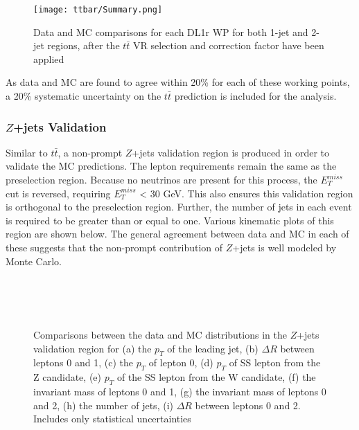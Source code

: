\begin{figure}[H] 
   \centering
   \texttt{[image: ttbar/Summary.png]}   
   \caption{Data and MC comparisons for each DL1r WP for both 1-jet and 2-jet regions, after the $t\bar{t}$ VR selection and correction factor have been applied}
   \label{fig:ttbar_summary}
\end{figure}

As data and MC are found to agree within 20\% for each of these working points, a 20\% systematic uncertainty on the $t\bar{t}$ prediction is included for the analysis.

\subsubsection{$Z$+jets Validation}

Similar to $t\bar{t}$, a non-prompt $Z$+jets validation region is produced in order to validate the MC predictions. The lepton requirements remain the same as the preselection region. Because no neutrinos are present for this process, the $E_T^{miss}$ cut is reversed, requiring $E_T^{miss}$ < 30 GeV. This also ensures this validation region is orthogonal to the preselection region. Further, the number of jets in each event is required to be greater than or equal to one. Various kinematic plots of this region are shown below. The general agreement between data and MC in each of these suggests that the non-prompt contribution of $Z$+jets is well modeled by Monte Carlo.

\begin{figure}[H] 
    \\
    \\
    \\
    \caption{Comparisons between the data and MC distributions in the $Z$+jets validation region for (a) the $p_T$ of the leading jet, (b) $\Delta R$ between leptons 0 and 1, (c) the $p_T$ of lepton 0, (d) $p_T$ of SS lepton from the Z candidate, (e) $p_T$ of the SS lepton from the W candidate, (f) the invariant mass of leptons 0 and 1, (g) the invariant mass of leptons 0 and 2, (h) the number of jets, (i) $\Delta R$ between leptons 0 and 2. Includes only statistical uncertainties}%
    \label{fig:zjets_noScale}
\end{figure}

